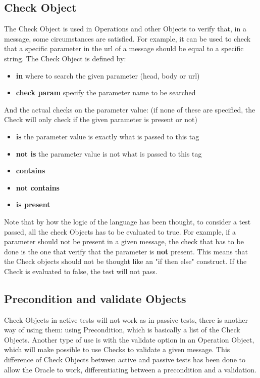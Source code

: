 \subsection{Check Object}
The Check Object is used in Operations and other Objects to verify that, in a message, some circumstances are satisfied. For example, it can be used to check that a specific parameter in the url of a message should be equal to a specific string.
The Check Object is defined by:
\begin{itemize}
    \item \textbf{in} where to search the given parameter (head, body or url)
    \item \textbf{check param} specify the parameter name to be searched
\end{itemize}
And the actual checks on the parameter value: (if none of these are specified, the Check will only check if the given parameter is present or not)
\begin{itemize}
    \item \textbf{is} the parameter value is exactly what is passed to this tag
    \item \textbf{not is} the parameter value is not what is passed to this tag
    \item \textbf{contains} 
    \item \textbf{not contains}
    \item \textbf{is present}
\end{itemize}

Note that by how the logic of the language has been thought, to consider a test passed, all the check Objects has to be evaluated to true. For example, if a parameter should not be present in a given message, the check that has to be done is the one that verify that the parameter is \textbf{not} present. This means that the Check objects should not be thought like an "if then else" construct. If the Check is evaluated to false, the test will not pass.

\subsection{Precondition and validate Objects}
Check Objects in active tests will not work as in passive tests, there is another way of using them: using Precondition, which is basically a list of the Check Objects. Another type of use is with the validate option in an Operation Object, which will make possible to use Checks to validate a given message. This difference of Check Objects between active and passive tests has been done to allow the Oracle to work, differentiating between a precondition and a validation.
